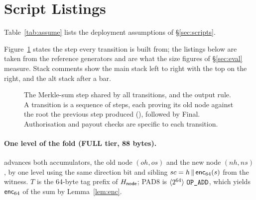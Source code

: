 \section{Script Listings}\label{app:scripts}

\iffullversion\else
Table~\ref{tab:assume} lists the deployment assumptions of
\S\ref{sec:scripts}.

\fi

Figure~\ref{fig:step} states the step every transition is built from; the listings below are taken from the reference generators and are what
the size figures of \S\ref{sec:eval} measure. Stack comments show the
main stack left to right with the top on the right, and the alt stack
after a bar.

\begin{figure}[h]
\centering
\begin{pcvstack}[center]
\pcvspace
{}
\end{pcvstack}
\caption{The Merkle-sum step shared by all transitions, and the output rule. A transition is a sequence of steps, each proving its old node against the root the previous step produced (), followed by \textsf{Final}. Authorisation and payout checks are specific to each transition.}
\label{fig:step}
\end{figure}

\paragraph{One level of the fold (FULL tier, 88 bytes).}
 advances both accumulators, the old node $(oh, os)$ and the
new node $(nh, ns)$, by one level using the same direction bit and
sibling $sc = h \,\|\, \mathsf{enc}_{64}(s)$ from the witness. $T$ is the
64-byte tag prefix of $H_{\mathsf{node}}$; \textsf{PAD8} is
$\langle 2^{64}\rangle\ \texttt{OP\_ADD}$, which yields $\mathsf{enc}_{64}$ of the sum by
Lemma~\ref{lem:enc}.

